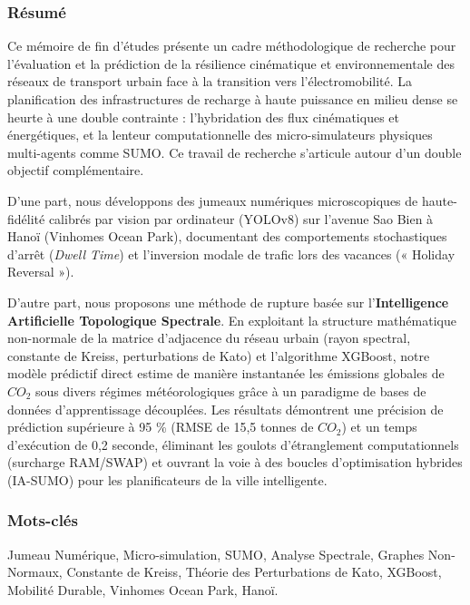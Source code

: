 \documentclass[10pt, a4paper]{article}
\begin{document}
\subsubsection{Résumé}\label{ruxe9sumuxe9}

Ce mémoire de fin d'études présente un cadre méthodologique de recherche
pour l'évaluation et la prédiction de la résilience cinématique et
environnementale des réseaux de transport urbain face à la transition
vers l'électromobilité. La planification des infrastructures de recharge
à haute puissance en milieu dense se heurte à une double contrainte :
l'hybridation des flux cinématiques et énergétiques, et la lenteur
computationnelle des micro-simulateurs physiques multi-agents comme
SUMO. Ce travail de recherche s'articule autour d'un double objectif
complémentaire.

D'une part, nous développons des jumeaux numériques microscopiques de
haute-fidélité calibrés par vision par ordinateur (YOLOv8) sur l'avenue
Sao Bien à Hanoï (Vinhomes Ocean Park), documentant des comportements
stochastiques d'arrêt (\emph{Dwell Time}) et l'inversion modale de
trafic lors des vacances (« Holiday Reversal »).

D'autre part, nous proposons une méthode de rupture basée sur
l'\textbf{Intelligence Artificielle Topologique Spectrale}. En
exploitant la structure mathématique non-normale de la matrice
d'adjacence du réseau urbain (rayon spectral, constante de Kreiss,
perturbations de Kato) et l'algorithme XGBoost, notre modèle prédictif
direct estime de manière instantanée les émissions globales de \(CO_2\)
sous divers régimes météorologiques grâce à un paradigme de bases de
données d'apprentissage découplées. Les résultats démontrent une
précision de prédiction supérieure à 95 \% (RMSE de 15,5 tonnes de
\(CO_2\)) et un temps d'exécution de 0,2 seconde, éliminant les goulots
d'étranglement computationnels (surcharge RAM/SWAP) et ouvrant la voie à
des boucles d'optimisation hybrides (IA-SUMO) pour les planificateurs de
la ville intelligente.

\subsubsection{Mots-clés}\label{mots-cluxe9s}

Jumeau Numérique, Micro-simulation, SUMO, Analyse Spectrale, Graphes
Non-Normaux, Constante de Kreiss, Théorie des Perturbations de Kato,
XGBoost, Mobilité Durable, Vinhomes Ocean Park, Hanoï.

\newpage
\end{document}
